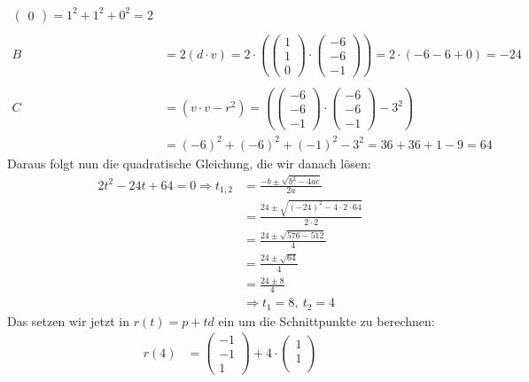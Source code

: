 \documentclass[11pt]{article}
\begin{document}
\begin{enumerate}
\begin{align*}
\begin{pmatrix*}
    0
  \end{pmatrix*} = 1^2 + 1^2 + 0^2 = 2\\\\
  B &= 2(d \cdot v) = 2 \cdot \left( \begin{pmatrix*}
    1\\
    1\\
    0
  \end{pmatrix*} \cdot \begin{pmatrix*}
    -6\\
    -6\\
    -1
  \end{pmatrix*} \right) = 2 \cdot (-6 -6 + 0) = -24\\ \\
  C &= (v \cdot v - r^2) = \left( \begin{pmatrix*}
      -6\\
      -6\\
      -1
  \end{pmatrix*} \cdot \begin{pmatrix*}
     -6\\
    -6\\
    -1
  \end{pmatrix*} - 3^2 \right) 
  \\ &= (-6)^2 + (-6)^2 + (-1)^2 - 3^2 = 36 + 36 + 1 - 9 = 64
\end{align*}
Daraus folgt nun die quadratische Gleichung, die wir danach lösen: 
\begin{align*}
  2t^2 - 24t + 64 = 0
   \Rightarrow t_{1,2} &= \frac{-b \pm \sqrt{b^2 - 4ac}}{2a}\\ &= \frac{24 \pm \sqrt{(-24)^2 - 4 \cdot 2 \cdot 64}}{2 \cdot 2}\\&= \frac{24 \pm \sqrt{576 - 512}}{4} \\&= \frac{24 \pm \sqrt{64}}{4}\\ &= \frac{24 \pm 8}{4} \\
   &\Rightarrow t_1 = 8, ~t_2 = 4
\end{align*}
Das setzen wir jetzt in $r(t) = p + td$ ein um die Schnittpunkte zu berechnen: 
\begin{align*}
  r(4) &= \begin{pmatrix*}
    -1\\
    -1\\
    1
  \end{pmatrix*} + 4 \cdot \begin{pmatrix*}
    1\\
    1\\

\end{pmatrix*}
\end{align*}
\end{enumerate}
\end{document}
